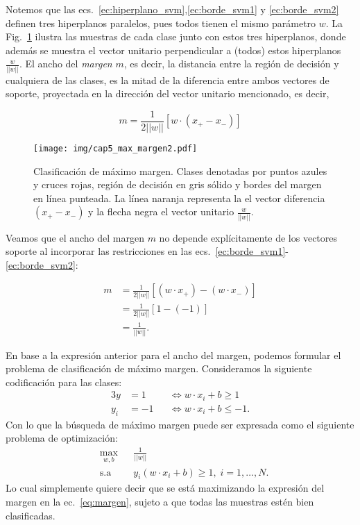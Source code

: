 Notemos que las ecs.~\eqref{ec:hiperplano_svm},\eqref{ec:borde_svm1} y \eqref{ec:borde_svm2} definen tres hiperplanos paralelos, pues todos tienen el mismo parámetro $w$. La Fig.~\ref{fig:clasif_margen} ilustra las muestras de cada clase junto con estos tres hiperplanos, donde además se muestra el vector unitario perpendicular a (todos) estos hiperplanos $\frac{w}{||w||}$. El ancho del \emph{margen} $m$, es decir, la distancia entre la región de decisión y cualquiera de las clases, es la mitad de la diferencia entre ambos vectores de soporte, proyectada en la dirección del vector unitario mencionado, es decir, 

\begin{equation}
 	m = \frac{1}{2||w||}[ w \cdot (x_{+} - x_{-})]
\end{equation} 

\begin{figure}[ht]
    \centering
    \texttt{[image: img/cap5\_max\_margen2.pdf]}
    \caption{Clasificación de máximo margen. Clases denotadas por puntos azules y cruces rojas, región de decisión en gris sólido y bordes del margen en línea punteada. La línea naranja representa la  el vector diferencia $(x_+ - x_{-})$ y la flecha negra el vector unitario $\frac{w}{||w||}$.}
    \label{fig:clasif_margen}
\end{figure}

Veamos que el ancho del margen $m$ no depende explícitamente de los vectores soporte al incorporar las restricciones en las ecs.~\eqref{ec:borde_svm1}-\eqref{ec:borde_svm2}:

\begin{align}
    m &= \frac{1}{2||w||} [ (w\cdot x_{+}) - (w\cdot x_{-})]\nonumber\\
    &= \frac{1}{2||w||} [1 - (-1)]\nonumber\\
    &= \frac{1}{||w||}.\label{eq:margen}
\end{align}

En base a la expresión anterior para el ancho del margen, podemos formular el problema de clasificación de máximo margen. Consideramos la siguiente codificación para las clases:
\begin{alignat}{3}
 	y&=1 &&\Leftrightarrow w\cdot x_i + b \geq1 \label{eq:codif_svm1}\\
 	y_i &=-1 &&\Leftrightarrow w\cdot x_i + b \leq -1.\label{eq:codif_svm2}
 \end{alignat}
Con lo que la búsqueda de máximo margen puede ser expresada como el siguiente problema de optimización:
\begin{equation*}
\begin{aligned}
& \underset{w,b}{\text{max}}
& & \frac{1}{||w||}\\
& \text{s.a}
& & y_i (w\cdot x_i +b) \geq 1, \; i = 1, \ldots, N.
\end{aligned}
\end{equation*}
Lo cual simplemente quiere decir que se está maximizando la expresión del margen en la ec.~\eqref{eq:margen}, sujeto a que todas las muestras estén bien clasificadas. 

